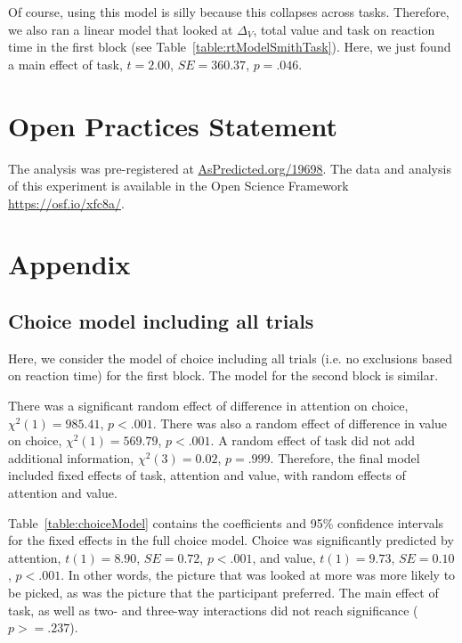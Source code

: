 \documentclass[12pt]{article}
\begin{document}


Of course, using this model is silly because this collapses across tasks. Therefore, we also ran a linear model that looked at $\Delta_V$, total value and task on reaction time in the first block (see Table~\ref{table:rtModelSmithTask}). Here, we just found a main effect of task, $t=2.00$, $SE=360.37$, $p=.046$.


\clearpage
\section{Open Practices Statement}
The analysis was pre-registered at \url{AsPredicted.org/19698}. The data and analysis of this experiment is available in the Open Science Framework \url{https://osf.io/xfc8a/}. 




\clearpage
\section{Appendix}
\subsection{Choice model including all trials}
Here, we consider the model of choice including all trials (i.e. no exclusions based on reaction time) for the first block. The model for the second block is similar. 

There was a significant random effect of difference in attention on choice, $\chi^2(1)=985.41$, $p<.001$. There was also a random effect of difference in value on choice, $\chi^2(1)=569.79$, $p<.001$. A random effect of task did not add additional information, $\chi^2(3)=0.02$, $p=.999$. Therefore, the final model included fixed effects of task, attention and value, with random effects of attention and value.



Table~\ref{table:choiceModel} contains the coefficients and 95\% confidence intervals for the fixed effects in the full choice model. Choice was significantly predicted by attention, $t(1)=8.90$, $SE=0.72$, $p<.001$, and value, $t(1)=9.73$, $SE=0.10$, $p<.001$. In other words, the picture that was looked at more was more likely to be picked, as was the picture that the participant preferred. The main effect of task, as well as two- and three-way interactions did not reach significance ($p>=.237$).



\clearpage
\newpage


\end{document}
